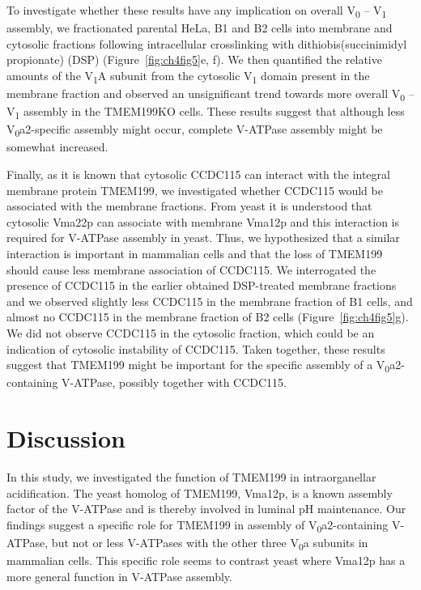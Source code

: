To investigate whether these results have any implication on overall V\textsubscript{0} – V\textsubscript{1} assembly, we fractionated parental HeLa, B1 and B2 cells into membrane and cytosolic fractions following intracellular crosslinking with dithiobis(succinimidyl propionate) (DSP) (Figure~\ref{fig:ch4fig5}e, f). We then quantified the relative amounts of the V\textsubscript{1}A subunit from the cytosolic V\textsubscript{1} domain present in the membrane fraction and observed an unsignificant trend towards more overall V\textsubscript{0} – V\textsubscript{1} assembly in the TMEM199KO cells. These results suggest that although less V\textsubscript{0}a2-specific assembly might occur, complete V-ATPase assembly might be somewhat increased.

Finally, as it is known that cytosolic CCDC115 can interact with the integral membrane protein TMEM199\cite{miles_vacuolar-atpase_2017}, we investigated whether CCDC115 would be associated with the membrane fractions. From yeast it is understood that cytosolic Vma22p can associate with membrane Vma12p\cite{graham_assembly_1998} and this interaction is required for V-ATPase assembly in yeast. Thus, we hypothesized that a similar interaction is important in mammalian cells and that the loss of TMEM199 should cause less membrane association of CCDC115. We interrogated the presence of CCDC115 in the earlier obtained DSP-treated membrane fractions and we observed slightly less CCDC115 in the membrane fraction of B1 cells, and almost no CCDC115 in the membrane fraction of B2 cells (Figure~\ref{fig:ch4fig5}g). We did not observe CCDC115 in the cytosolic fraction, which could be an indication of cytosolic instability of CCDC115. Taken together, these results suggest that TMEM199 might be important for the specific assembly of a V\textsubscript{0}a2-containing V-ATPase, possibly together with CCDC115.

\clearpage

\section{Discussion}

In this study, we investigated the function of TMEM199 in intraorganellar acidification. The yeast homolog of TMEM199, Vma12p, is a known assembly factor of the V-ATPase\cite{graham_assembly_1998,jackson_vma12_1997} and is thereby involved in luminal pH maintenance. Our findings suggest a specific role for TMEM199 in assembly of V\textsubscript{0}a2-containing V-ATPase, but not or less V-ATPases with the other three V\textsubscript{0}a subunits in mammalian cells\cite{sun-wada_direct_2009,toyomura_lysosomes_2003,saw_vacuolar_2011,kornak_impaired_2008,pietrement_distinct_2006,hurtado-lorenzo_v-atpase_2006}. This specific role seems to contrast yeast where Vma12p has a more general function in V-ATPase assembly\cite{graham_assembly_1998,jackson_vma12_1997}.

